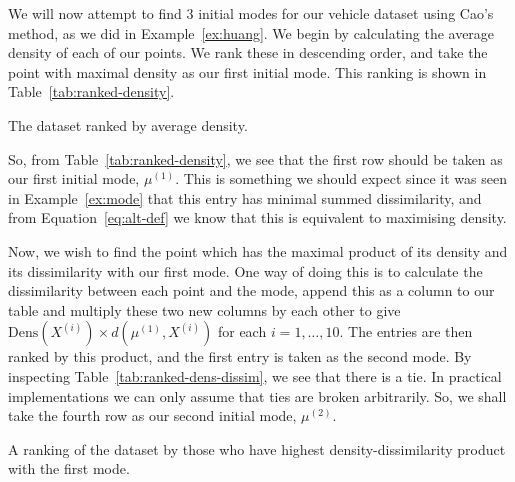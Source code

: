 \begin{example}\label{ex:cao}
    We will now attempt to find \(3\) initial modes for our vehicle dataset 
    using Cao's method, as we did in Example~\ref{ex:huang}. We begin by 
    calculating the average density of each of our points. We rank these in 
    descending order, and take the point with maximal density as our first 
    initial mode. This ranking is shown in Table~\ref{tab:ranked-density}.

    \begin{table}[H]
        \centering
        \singlespacing{%
        \resizebox{.8\textwidth}{!}{%
            
        }}
        \caption{The dataset ranked by average
            density.}\label{tab:ranked-density}
    \end{table}

    So, from Table~\ref{tab:ranked-density}, we see that the first row should be
    taken as our first initial mode, \(\mu^{(1)}\). This is something we should
    expect since it was seen in Example~\ref{ex:mode} that this entry has
    minimal summed dissimilarity, and from Equation~\ref{eq:alt-def} we know
    that this is equivalent to maximising density.
    
    Now, we wish to find the point which has the maximal product of its density
    and its dissimilarity with our first mode. One way of doing this is to 
    calculate the dissimilarity between each point and the mode, append this
    as a column to our table and multiply these two new columns by each other
    to give \(\text{Dens}(X^{(i)}) \times d(\mu^{(1)}, X^{(i)})\) for each \(i =
    1, \ldots, 10\). The entries are then ranked by this product, and the first
    entry is taken as the second mode. By inspecting 
    Table~\ref{tab:ranked-dens-dissim}, we see that there is a tie. In practical
    implementations we can only assume that ties are broken arbitrarily. So, we
    shall take the fourth row as our second initial mode, \(\mu^{(2)}\).

    \begin{table}[H]
        \singlespacing{%
        \resizebox{\textwidth}{!}{%
            
        }}
        \caption{A ranking of the dataset by those who have highest
            density-dissimilarity product with the first
            mode.}\label{tab:ranked-dens-dissim}
    \end{table}


\end{example}
